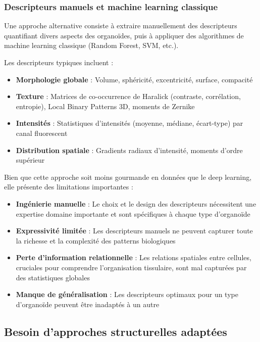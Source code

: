 \subsubsection{Descripteurs manuels et machine learning classique}

Une approche alternative consiste à extraire manuellement des descripteurs quantifiant divers aspects des organoïdes, puis à appliquer des algorithmes de machine learning classique (Random Forest, SVM, etc.).

Les descripteurs typiques incluent :
\begin{itemize}
    \item \textbf{Morphologie globale} : Volume, sphéricité, excentricité, surface, compacité
    \item \textbf{Texture} : Matrices de co-occurrence de Haralick (contraste, corrélation, entropie), Local Binary Patterns 3D, moments de Zernike
    \item \textbf{Intensités} : Statistiques d'intensités (moyenne, médiane, écart-type) par canal fluorescent
    \item \textbf{Distribution spatiale} : Gradients radiaux d'intensité, moments d'ordre supérieur
\end{itemize}

Bien que cette approche soit moins gourmande en données que le deep learning, elle présente des limitations importantes :
\begin{itemize}
    \item \textbf{Ingénierie manuelle} : Le choix et le design des descripteurs nécessitent une expertise domaine importante et sont spécifiques à chaque type d'organoïde
    \item \textbf{Expressivité limitée} : Les descripteurs manuels ne peuvent capturer toute la richesse et la complexité des patterns biologiques
    \item \textbf{Perte d'information relationnelle} : Les relations spatiales entre cellules, cruciales pour comprendre l'organisation tissulaire, sont mal capturées par des statistiques globales
    \item \textbf{Manque de généralisation} : Les descripteurs optimaux pour un type d'organoïde peuvent être inadaptés à un autre
\end{itemize}

\subsection{Besoin d'approches structurelles adaptées}

